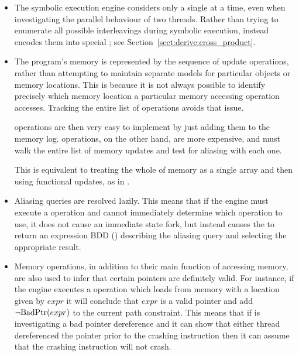 \begin{itemize}
\item The symbolic execution engine considers only a single
  {\StateMachine} at a time, even when investigating the parallel
  behaviour of two threads.  Rather than trying to enumerate all
  possible interleavings during symbolic execution, {\technique}
  instead encodes them into special 
  {\StateMachines}; see Section~\ref{sect:derive:cross_product}.

\item The program's memory is represented by the sequence of update
  operations, rather than attempting to maintain separate models for
  particular objects or memory locations.  This is because it is not
  always possible to identify precisely which memory location a
  particular memory accessing operation accesses.  Tracking the entire
  list of operations avoids that issue.

   operations are then very easy to implement by just
  adding them to the memory log.   operations, on the
  other hand, are more expensive, and must walk the entire list of
  memory updates and test for aliasing with each one.

  This is equivalent to treating the whole of memory as a single array
  and then using functional updates, as in \needCite{}.  


\item Aliasing queries are resolved lazily.  This means that if the
  engine must execute a  operation and cannot immediately
  determine which  operation to use, it does not cause an
  immediate state fork, but instead causes the  to return
  an expression BDD () describing the aliasing
  query and selecting the appropriate result.    

\item Memory operations, in addition to their main function of
  accessing memory, are also used to infer that certain pointers are
  definitely valid.  For instance, if the engine executes a
   operation which loads from memory with a location given
  by $\mathit{expr}$ it will conclude that $\mathit{expr}$ is a valid
  pointer and add ${\neg}\mathrm{BadPtr}(expr)$ to the current path
  constraint.  This means that if {\technique} is investigating a bad
  pointer dereference and it can show that either thread dereferenced
  the pointer prior to the crashing instruction then it can assume
  that the crashing instruction will not crash.


\end{itemize}
